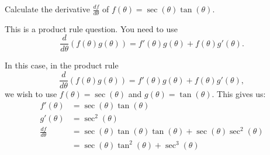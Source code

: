 \documentclass{ximera}
\author{Emma Smith Zbarsky}
\begin{document}
\begin{exercise}

Calculate the derivative $\frac{df}{d\theta}$ of
$f(\theta) = \sec(\theta)\tan(\theta).$


\begin{hint}
This is a product rule question. You need to use
\[\frac{d}{d\theta}\left(f(\theta)g(\theta)\right) = f'(\theta)g(\theta)+f(\theta)g'(\theta).\]
\end{hint}


\begin{hint}
In this case, in the product rule
\[\frac{d}{d\theta}\left(f(\theta)g(\theta)\right) = f'(\theta)g(\theta)+f(\theta)g'(\theta),\]
we wish to use $f(\theta) = \sec(\theta)$ and
$g(\theta) = \tan(\theta).$ This gives us: \begin{align*}
f'(\theta) &= \sec(\theta)\tan(\theta) \\
g'(\theta) &= \sec^2(\theta) \\
\frac{df}{d\theta} &= \sec(\theta)\tan(\theta)\tan(\theta) + \sec(\theta)\sec^2(\theta) \\
&= \boxed{\sec(\theta)\tan^2(\theta)+\sec^3(\theta)}
\end{align*}
\end{hint}


\begin{multipleChoice}
\end{multipleChoice}

\end{exercise}
\end{document}
